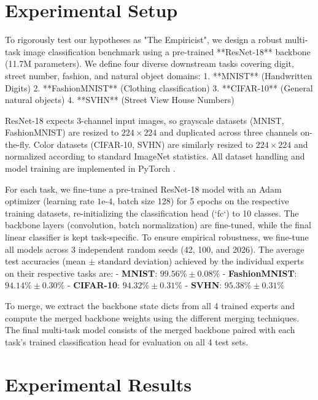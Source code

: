 \documentclass{article}
\theoremstyle{plain}
\theoremstyle{definition}
\theoremstyle{remark}
\begin{document}
\section{Experimental Setup}
\label{sec:setup}

To rigorously test our hypotheses as "The Empiricist", we design a robust multi-task image classification benchmark using a pre-trained **ResNet-18** \cite{he2016deep} backbone (11.7M parameters). We define four diverse downstream tasks covering digit, street number, fashion, and natural object domains:
1. **MNIST** (Handwritten Digits) \cite{lecun1998gradient}
2. **FashionMNIST** (Clothing classification) \cite{xiao2017fashion}
3. **CIFAR-10** (General natural objects) \cite{krizhevsky2009learning}
4. **SVHN** (Street View House Numbers) \cite{netzer2011reading}

ResNet-18 expects 3-channel input images, so grayscale datasets (MNIST, FashionMNIST) are resized to $224 \times 224$ and duplicated across three channels on-the-fly. Color datasets (CIFAR-10, SVHN) are similarly resized to $224 \times 224$ and normalized according to standard ImageNet \cite{deng2009imagenet} statistics. All dataset handling and model training are implemented in PyTorch \cite{paszke2019pytorch}.

For each task, we fine-tune a pre-trained ResNet-18 model with an Adam optimizer \cite{kingma2014adam} (learning rate $1\text{e-}4$, batch size 128) for 5 epochs on the respective training datasets, re-initializing the classification head (`fc`) to 10 classes. The backbone layers (convolution, batch normalization) are fine-tuned, while the final linear classifier is kept task-specific. To ensure empirical robustness, we fine-tune all models across 3 independent random seeds (42, 100, and 2026). The average test accuracies (mean $\pm$ standard deviation) achieved by the individual experts on their respective tasks are:
- \textbf{MNIST}: $99.56\% \pm 0.08\%$
- \textbf{FashionMNIST}: $94.14\% \pm 0.30\%$
- \textbf{CIFAR-10}: $94.32\% \pm 0.31\%$
- \textbf{SVHN}: $95.38\% \pm 0.31\%$

To merge, we extract the backbone state dicts from all 4 trained experts and compute the merged backbone weights using the different merging techniques. The final multi-task model consists of the merged backbone paired with each task's trained classification head for evaluation on all 4 test sets.

\section{Experimental Results}
\label{sec:results}
\end{document}
